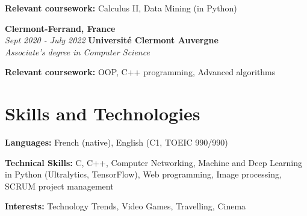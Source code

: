         \begin{onecolentry}
            \begin{highlights}
                \item \textbf{Relevant coursework:} Calculus II, Data Mining (in Python)
            \end{highlights}
        \end{onecolentry}

		\begin{twocolentry}{
			\textbf{Clermont-Ferrand, France} \\
			\textit{Sept 2020 - July 2022}
            }{
            \textbf{Université Clermont Auvergne} \\
            \textit{Associate's degree in Computer Science}
            }
        \end{twocolentry}

        \begin{onecolentry}
            \begin{highlights}
                \item \textbf{Relevant coursework:} OOP, C++ programming, Advanced algorithms
            \end{highlights}
        \end{onecolentry}


    \section{Skills and Technologies}
        \begin{onecolentry}
            \textbf{Languages:} French (native), English (C1, TOEIC 990/990) 
        \end{onecolentry}

        \begin{onecolentry}
            \textbf{Technical Skills:} C, C++, Computer Networking, Machine and Deep Learning in Python (Ultralytics, TensorFlow), Web programming, Image processing, SCRUM project management
        \end{onecolentry}

        \begin{onecolentry}
            \textbf{Interests:} Technology Trends, Video Games, Travelling, Cinema
        \end{onecolentry}
